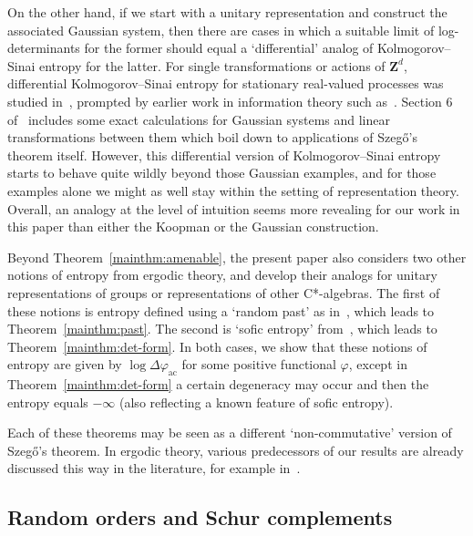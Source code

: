 \documentclass[12pt,a4paper]{article}
\numberwithin{equation}{section}
\theoremstyle{remark}
\renewcommand{\rm}[1]{\mathrm{#1}}
\newcommand{\bbZ}{\mathbf{Z}}
\renewcommand{\phi}{\varphi}
\begin{document}
On the other hand, if we start with a unitary representation and construct the associated Gaussian system, then there are cases in which a suitable limit of log-determinants for the former should equal a `differential' analog of Kolmogorov--Sinai entropy for the latter.  For single transformations or actions of $\bbZ^d$, differential Kolmogorov--Sinai entropy for stationary real-valued processes was studied in~\cite{HamParTho08}, prompted by earlier work in information theory such as~\cite{Pin64}.  Section 6 of~\cite{HamParTho08} includes some exact calculations for Gaussian systems and linear transformations between them which boil down to applications of Szeg\H{o}'s theorem itself.  However, this differential version of Kolmogorov--Sinai entropy starts to behave quite wildly beyond those Gaussian examples, and for those examples alone we might as well stay within the setting of representation theory.  Overall, an analogy at the level of intuition seems more revealing for our work in this paper than either the Koopman or the Gaussian construction.

Beyond Theorem~\ref{mainthm:amenable}, the present paper also considers two other notions of entropy from ergodic theory, and develop their analogs for unitary representations of groups or representations of other C*-algebras.  The first of these notions is entropy defined using a `random past' as in~\cite[Thm. 3]{Kie75}, which leads to Theorem~\ref{mainthm:past}.  The second is `sofic entropy' from~\cite{Bowen10}, which leads to Theorem~\ref{mainthm:det-form}.  In both cases, we show that these notions of entropy are given by $\log \Delta \phi_{\rm{ac}}$ for some positive functional $\phi$, except in Theorem~\ref{mainthm:det-form} a certain degeneracy may occur and then the entropy equals $-\infty$ (also reflecting a known feature of sofic entropy).

Each of these theorems may be seen as a different `non-commutative' version of Szeg\H{o}'s theorem.  In ergodic theory, various predecessors of our results are already discussed this way in the literature, for example in~\cite{Lyons05,LiTho14,Hayes16}.


\subsection{Random orders and Schur complements}\label{subs:past}
\end{document}
